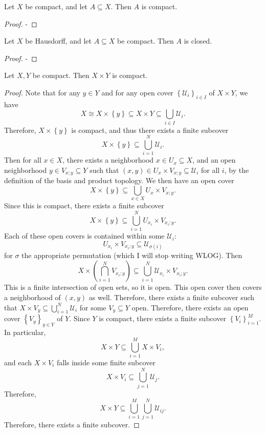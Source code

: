 \begin{proposition}\label{prp:5.2}
	Let $X$ be compact, and let $A\subseteq X$. Then $A$ is compact.
\end{proposition}
\begin{proof}
	-
\end{proof}
\begin{proposition}\label{prp:5.3}
	Let $X$ be Hausdorff, and let $A\subseteq X$ be compact. Then $A$ is closed.
\end{proposition}
\begin{proof}
	-
\end{proof}
\begin{proposition}\label{prp:5.4}
	Let $X,Y$ be compact. Then $X\times Y$ is compact.
\end{proposition}
\begin{proof}
	Note that for any $y\in Y$ and for any open cover $\left\{ \mathcal{U} _i \right\}_{i\in I} $ of $X\times Y$, we have
	\[
		X \cong X\times \left\{ y \right\} \subseteq X\times Y \subseteq \bigcup_{i\in I} \mathcal{U}_i
	.\]
	Therefore, $X\times \left\{ y \right\} $ is compact, and thus there exists a finite subcover
	\[
		X\times \left\{ y \right\} \subseteq \bigcup_{i=1}^N \mathcal{U} _i
	.\]
	Then for all $x\in X$, there exists a neighborhood $x\in U_x \subseteq X$, and an open neighborhood $y\in V_{x;y} \subseteq Y$ such that $(x,y)\in U_x\times V_{x;y} \subseteq \mathcal{U}_i$ for all $i$, by the definition of the basis and product topology. We then have an open cover
	\[
		X\times \left\{ y \right\} \subseteq \bigcup_{x\in X} U_x\times V_{x;y} 
	.\]
	Since this is compact, there exists a finite subcover
	\[
		X\times \left\{ y \right\} \subseteq \bigcup_{i=1}^N U_{x_i} \times V_{x_i;y} 
	.\]
	Each of these open covers is contained within some $\mathcal{U}_i$:
	\[
		U_{x_i} \times V_{x_i;y} \subseteq \mathcal{U}_{\sigma (i)} 
	\]
	for $\sigma $ the appropriate permutation (which I will stop writing WLOG). Then
	\[
		X\times \left( \bigcap_{i=1}^N V_{x_i;y}  \right) \subseteq \bigcup_{i=1}^N \mathcal{U}_{x_i} \times V_{x_i;y} 
	.\]
	This is a finite intersection of open sets, so it is open. This open cover then covers a neighborhood of $(x,y)$ as well. Therefore, there exists a finite subcover such that $X\times V_y\subseteq \bigcup_{i=1}^N \mathcal{U}_i$ for some $V_y\subseteq Y$ open. Therefore, there exists an open cover $\left\{ V_y \right\}_{y\in Y} $ of $Y$. Since $Y$ is compact, there exists a finite subcover $\left\{ V_i \right\}_{i=1}^M$. In particular,
	\[
		X\times Y \subseteq \bigcup_{i=1}^M X\times V_i,
	\]
	and each $X\times V_i$ falls inside some finite subcover
	\[
		X\times V_i \subseteq \bigcup_{j=1}^N \mathcal{U} _j
	.\]
	Therefore,
	\[
		X\times Y\subseteq \bigcup_{i=1}^M \bigcup_{j=1}^N \mathcal{U}_{ij} 
	.\]
	Therefore, there exists a finite subcover.
\end{proof}

